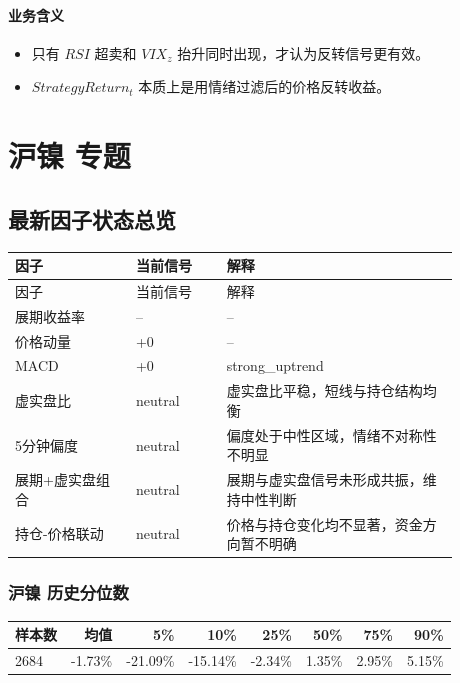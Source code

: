 \documentclass[11pt,a4paper]{ctexart}
\begin{document}
\paragraph{业务含义}
\begin{itemize}
\item 只有 $RSI$ 超卖和 $VIX_z$ 抬升同时出现，才认为反转信号更有效。
\item $StrategyReturn_t$ 本质上是用情绪过滤后的价格反转收益。
\end{itemize}
        \section{沪镍 专题}

\subsection{最新因子状态总览}
\begin{longtable}{p{0.24\linewidth}p{0.18\linewidth}p{0.46\linewidth}}
\toprule
因子 & 当前信号 & 解释 \\
\midrule
\endfirsthead
\toprule
因子 & 当前信号 & 解释 \\
\midrule
\endhead
展期收益率 & -- & -- \\
价格动量 & +0 & -- \\
MACD & +0 & strong\_uptrend \\
虚实盘比 & neutral & 虚实盘比平稳，短线与持仓结构均衡 \\
5分钟偏度 & neutral & 偏度处于中性区域，情绪不对称性不明显 \\
展期+虚实盘组合 & neutral & 展期与虚实盘信号未形成共振，维持中性判断 \\
持仓-价格联动 & neutral & 价格与持仓变化均不显著，资金方向暂不明确 \\
\bottomrule
\end{longtable}

\subsubsection{沪镍 历史分位数}
\begin{center}
\begin{tabular}{lrrrrrrr}
\toprule
样本数 & 均值 & 5\% & 10\% & 25\% & 50\% & 75\% & 90\% \\
\midrule
2684 & -1.73\% & -21.09\% & -15.14\% & -2.34\% & 1.35\% & 2.95\% & 5.15\% \\
\bottomrule
\end{tabular}
\end{center}
\end{document}
